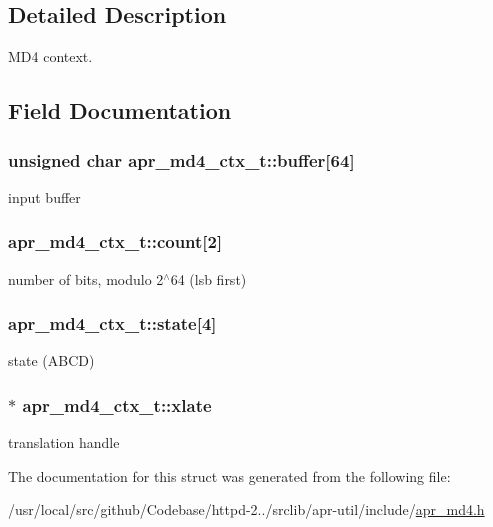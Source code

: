 \subsection{Detailed Description}
M\+D4 context. 

\subsection{Field Documentation}
\subsubsection[{\texorpdfstring{buffer}{buffer}}]{\setlength{\rightskip}{0pt plus 5cm}unsigned char apr\+\_\+md4\+\_\+ctx\+\_\+t\+::buffer\mbox{[}64\mbox{]}}\hypertarget{structapr__md4__ctx__t_a60ce2de9e1c0b8888d81da03afdbfcdb}{}\label{structapr__md4__ctx__t_a60ce2de9e1c0b8888d81da03afdbfcdb}
input buffer 
\subsubsection[{\texorpdfstring{count}{count}}]{ apr\+\_\+md4\+\_\+ctx\+\_\+t\+::count\mbox{[}2\mbox{]}}\hypertarget{structapr__md4__ctx__t_a0332072316c6a931b6fb1bd8729e3495}{}\label{structapr__md4__ctx__t_a0332072316c6a931b6fb1bd8729e3495}
number of bits, modulo 2$^\wedge$64 (lsb first) 
\subsubsection[{\texorpdfstring{state}{state}}]{ apr\+\_\+md4\+\_\+ctx\+\_\+t\+::state\mbox{[}4\mbox{]}}\hypertarget{structapr__md4__ctx__t_a7fc20af590cdf6d01208a12ac0bbc5de}{}\label{structapr__md4__ctx__t_a7fc20af590cdf6d01208a12ac0bbc5de}
state (A\+B\+CD) 
\subsubsection[{\texorpdfstring{xlate}{xlate}}]{$\ast$ apr\+\_\+md4\+\_\+ctx\+\_\+t\+::xlate}\hypertarget{structapr__md4__ctx__t_ae4dd6785ef4bf0e04b37d566af786554}{}\label{structapr__md4__ctx__t_ae4dd6785ef4bf0e04b37d566af786554}
translation handle 

The documentation for this struct was generated from the following file\+:\begin{DoxyCompactItemize}
\item 
/usr/local/src/github/\+Codebase/httpd-\/2../srclib/apr-\/util/include/\hyperlink{apr__md4_8h}{apr\+\_\+md4.\+h}\end{DoxyCompactItemize}
